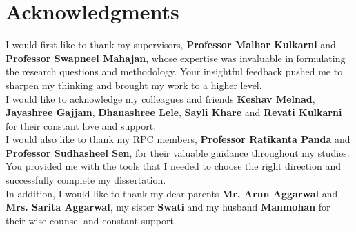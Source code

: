 \documentclass[a4paper,plainchapterheads,yschapters,twoside,truedoublelespace,openright]{iitbthesis}
\begin{document}
\chapter*{Acknowledgments}
\label{ch:Acknowledgments}
\vspace{10mm}
I would first like to thank my supervisors, \textbf{Professor Malhar Kulkarni} and \textbf{Professor Swapneel Mahajan}, whose expertise was invaluable in formulating the research questions and methodology. Your insightful feedback pushed me to sharpen my thinking and brought my work to a higher level.\\
I would like to acknowledge my colleagues and friends \textbf{Keshav Melnad}, \textbf{Jayashree Gajjam}, \textbf{Dhanashree Lele},  \textbf{Sayli Khare} and  \textbf{Revati Kulkarni} for their constant love and support. \\
I would also like to thank my RPC members,  \textbf{Professor Ratikanta Panda} and  \textbf{Professor Sudhasheel Sen}, for their valuable guidance throughout my studies. You provided me with the tools that I needed to choose the right direction and successfully complete my dissertation.\\
In addition, I would like to thank my dear parents  \textbf{Mr. Arun Aggarwal} and  \textbf{Mrs. Sarita Aggarwal}, my sister  \textbf{Swati} and my husband  \textbf{Manmohan} for their wise counsel and constant support. 
\end{document}
